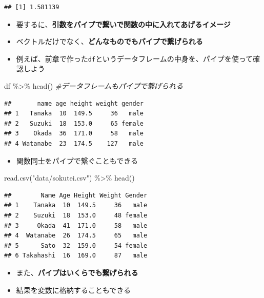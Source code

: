 \documentclass[
]{book}
\newenvironment{Shaded}{\begin{snugshade}}{\end{snugshade}}
\newcommand{\CommentTok}[1]{\textcolor[rgb]{0.56,0.35,0.01}{\textit{#1}}}
\newcommand{\FunctionTok}[1]{\textcolor[rgb]{0.00,0.00,0.00}{#1}}
\newcommand{\NormalTok}[1]{#1}
\newcommand{\SpecialCharTok}[1]{\textcolor[rgb]{0.00,0.00,0.00}{#1}}
\newcommand{\StringTok}[1]{\textcolor[rgb]{0.31,0.60,0.02}{#1}}
\providecommand{\tightlist}{%
  \setlength{\itemsep}{0pt}\setlength{\parskip}{0pt}}
\begin{document}
\begin{verbatim}
## [1] 1.581139
\end{verbatim}

\begin{itemize}
\tightlist
\item
  要するに、\textbf{引数をパイプで繋いで関数の中に入れてあげるイメージ}
\item
  ベクトルだけでなく、\textbf{どんなものでもパイプで繋げられる}
\item
  例えば、前章で作った\texttt{df}というデータフレームの中身を、パイプを使って確認しよう
\end{itemize}

\begin{Shaded}
\begin{Highlighting}[]
\NormalTok{df }\SpecialCharTok{\%\textgreater{}\%} \FunctionTok{head}\NormalTok{() }\CommentTok{\#データフレームもパイプで繋げられる}
\end{Highlighting}
\end{Shaded}

\begin{verbatim}
##       name age height weight gender
## 1   Tanaka  10  149.5     36   male
## 2   Suzuki  18  153.0     65 female
## 3    Okada  36  171.0     58   male
## 4 Watanabe  23  174.5    127   male
\end{verbatim}

\begin{itemize}
\tightlist
\item
  関数同士をパイプで繋ぐこともできる
\end{itemize}

\begin{Shaded}
\begin{Highlighting}[]
\FunctionTok{read.csv}\NormalTok{(}\StringTok{"data/sokutei.csv"}\NormalTok{) }\SpecialCharTok{\%\textgreater{}\%} \FunctionTok{head}\NormalTok{() }
\end{Highlighting}
\end{Shaded}

\begin{verbatim}
##        Name Age Height Weight Gender
## 1    Tanaka  10  149.5     36   male
## 2    Suzuki  18  153.0     48 female
## 3     Okada  41  171.0     58   male
## 4  Watanabe  26  174.5     65   male
## 5      Sato  32  159.0     54 female
## 6 Takahashi  16  169.0     87   male
\end{verbatim}

\begin{itemize}
\tightlist
\item
  また、\textbf{パイプはいくらでも繋げられる}
\item
  結果を変数に格納することもできる
\end{itemize}
\end{document}
